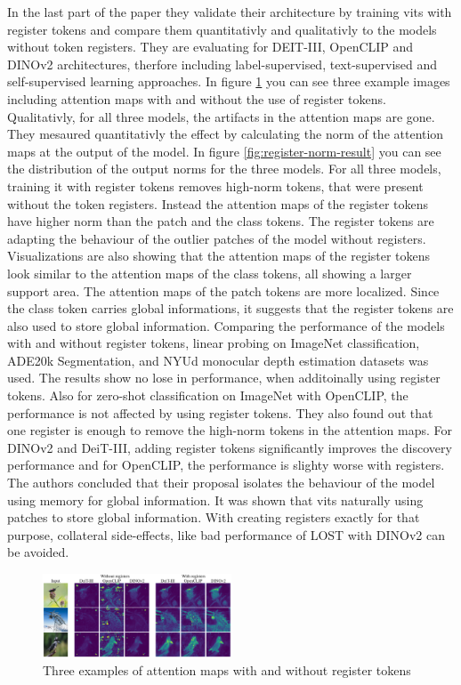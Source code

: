 \documentclass[conference]{IEEEtran}
\begin{document}
  In the last part of the paper they validate their architecture by training \acp{vit} with register tokens and compare them  quantitativly and qualitativly to the models without token registers. They are evaluating for DEIT-III, OpenCLIP and DINOv2 architectures, therfore including label-supervised, text-supervised and self-supervised learning approaches. In figure \ref{fig:register-result} you can see three example images including attention maps with and without the use of register tokens. Qualitativly, for all three models, the artifacts in the attention maps are gone. They mesaured quantitativly the effect by calculating the norm of the attention maps at the output of the model. In figure \ref{fig:register-norm-result} you can see the distribution of the output norms for the three models. For all three models, training it with register tokens removes high-norm tokens, that were present without the token registers. Instead the attention maps of the register tokens have  higher norm than the patch and the class tokens. The register tokens are adapting the behaviour of the outlier patches of the model without registers. Visualizations are also showing that the attention maps of the register tokens look similar to the attention maps of the class tokens, all showing a larger support area. The attention maps of the patch tokens are more localized. Since the class token carries global informations, it suggests that the register tokens are also used to store global information. 
  Comparing the performance of the models with and without register tokens, linear probing on ImageNet classification, ADE20k Segmentation, and NYUd monocular depth estimation datasets was used. The results show no lose in performance, when additoinally using register tokens. Also for zero-shot classification on ImageNet with OpenCLIP, the performance is not affected by using register tokens. They also found out that one register is enough to remove the high-norm tokens in the attention maps. For DINOv2 and DeiT-III, adding register tokens significantly improves the discovery performance and for OpenCLIP, the performance is slighty worse with registers. The authors concluded that their proposal isolates the behaviour of the model using memory for global information. It was shown that \acp{vit} naturally using patches to store global information. With creating registers exactly for that purpose, collateral side-effects, like bad performance of LOST with DINOv2 can be avoided.

  \begin{figure}
    \centering
    \includegraphics[width=0.5\textwidth]{figures/register-result.png}
    \caption{Three examples of attention maps with and without register tokens \cite{registers}}
    \label{fig:register-result}
  \end{figure}
\end{document}
